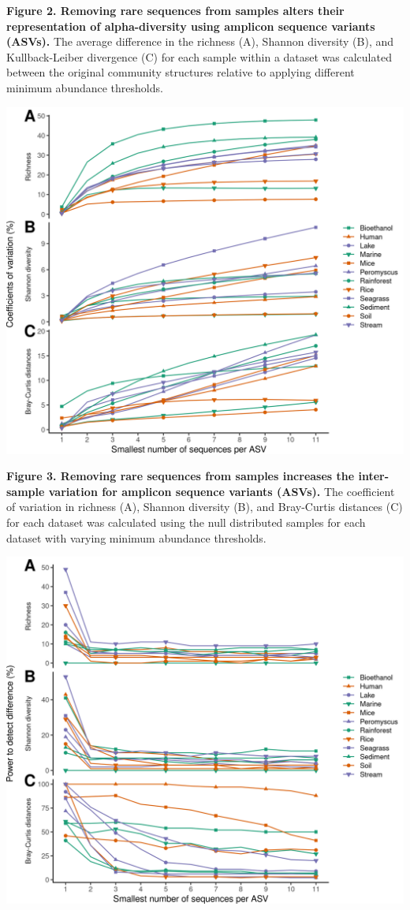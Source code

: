 \documentclass[
]{article}
\begin{document}
\textbf{Figure 2. Removing rare sequences from samples alters their
representation of alpha-diversity using amplicon sequence variants
(ASVs).} The average difference in the richness (A), Shannon diversity
(B), and Kullback-Leiber divergence (C) for each sample within a dataset
was calculated between the original community structures relative to
applying different minimum abundance thresholds.

\newpage

\includegraphics{figure_3.png}

\textbf{Figure 3. Removing rare sequences from samples increases the
inter-sample variation for amplicon sequence variants (ASVs).} The
coefficient of variation in richness (A), Shannon diversity (B), and
Bray-Curtis distances (C) for each dataset was calculated using the null
distributed samples for each dataset with varying minimum abundance
thresholds.

\newpage

\includegraphics{figure_4.png}
\end{document}
